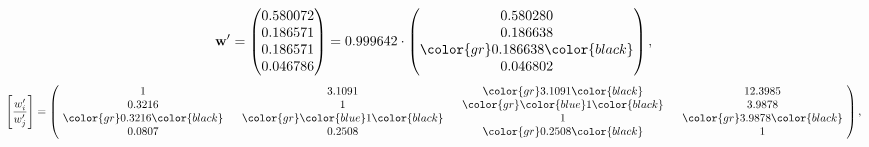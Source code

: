 \begin{example}
\begin{equation*}
\mathbf{w}^{\prime} =
\begin{pmatrix}
0.580072\\
0.186571\\
0.186571\\
0.046786
\end{pmatrix} =
0.999642\cdot
\begin{pmatrix}
0.580280\\
0.186638\\
\color{gr} 0.186638\color{black} \\
0.046802
\end{pmatrix},
\end{equation*}
\begin{equation*}
\left[ \frac{{w}^{\prime}_i}{{w}^{\prime}_j} \right] =
\begin{pmatrix}
$\,\,$ 1 $\,\,$ & $\,\,$3.1091$\,\,$ & $\,\,$\color{gr} 3.1091\color{black} $\,\,$ & $\,\,$12.3985$\,\,$ \\
$\,\,$0.3216$\,\,$ & $\,\,$ 1 $\,\,$ & $\,\,$\color{gr} \color{blue} 1\color{black} $\,\,$ & $\,\,$3.9878  $\,\,$ \\
$\,\,$\color{gr} 0.3216\color{black} $\,\,$ & $\,\,$\color{gr} \color{blue} 1\color{black} $\,\,$ & $\,\,$ 1 $\,\,$ & $\,\,$\color{gr} 3.9878\color{black}  $\,\,$ \\
$\,\,$0.0807$\,\,$ & $\,\,$0.2508$\,\,$ & $\,\,$\color{gr} 0.2508\color{black} $\,\,$ & $\,\,$ 1  $\,\,$ \\
\end{pmatrix},
\end{equation*}
\end{example}
\newpage
